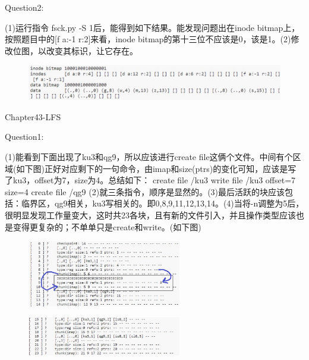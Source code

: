 \documentclass[12pt]{article}
\begin{document}
\noindent Question2:\par (1)运行指令 fsck.py -S 1后，能得到如下结果。能发现问题出在inode bitmap上，按照题目中的[f a:-1 r:2]来看，inode bitmap的第十三位不应该是0，该是1。(2)修改位图，以改变其标识，让它存在。
\begin{figure}[H]
    \centering
    \includegraphics*[width=1\textwidth]{hw12-9.jpg}
\end{figure}
\begin{Large}
    \noindent Chapter43-LFS\\
\end{Large}
Question1:\par
(1)能看到下面出现了ku3和qg9，所以应该进行create file这俩个文件。中间有个区域(如下图)正好对应剩下的一句命令，由imap和size(ptrs)的变化可知，应该是写了ku3，offset为7，size为4。总结如下： create file /ku3 
write file  /ku3 \;\;\; offset=7 size=4 \;\;\;
create file /qg9 
(2)就三条指令，顺序是显然的。(3)最后活跃的块应该包括：临界区，qg9相关，ku3写相关的。即0,8,9,11,12,13,14。(4)当将-n调整为5后，很明显发现工作量变大，这时共23各块，且有新的文件引入，并且操作类型应该也是变得更复杂的；不单单只是create和write。(如下图)
\begin{figure}[H]
    \centering
    \includegraphics*[width=0.6\textwidth]{hw12-10.jpg}
\end{figure}
\begin{figure}[H]
    \centering
    \includegraphics*[width=0.6\textwidth]{hw12-11.jpg}
\end{figure}
\end{document}
